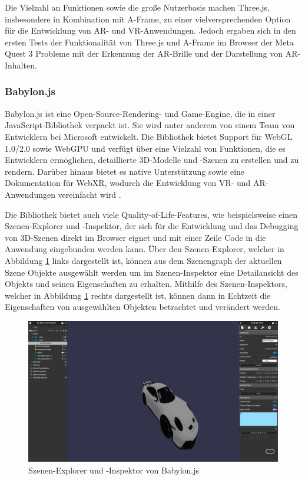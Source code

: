 Die Vielzahl an Funktionen sowie die große Nutzerbasis machen Three.js, insbesondere in Kombination mit A-Frame, zu einer vielversprechenden Option für die Entwicklung von AR- und VR-Anwendungen.
Jedoch ergaben sich in den ersten Tests der Funktionalität von Three.js und A-Frame im Browser der Meta Quest 3 Probleme mit der Erkennung der AR-Brille und der Darstellung von AR-Inhalten.

\subsubsection{Babylon.js}

Babylon.js ist eine Open-Source-Rendering- und Game-Engine, die in einer JavaScript-Bibliothek verpackt ist.
Sie wird unter anderem von einem Team von Entwicklern bei Microsoft entwickelt.
Die Bibliothek bietet Support für WebGL 1.0/2.0 sowie WebGPU und verfügt über eine Vielzahl von Funktionen, die es Entwicklern ermöglichen, detaillierte 3D-Modelle und -Szenen zu erstellen und zu rendern.
Darüber hinaus bietet es native Unterstützung sowie eine Dokumentation für WebXR, wodurch die Entwicklung von VR- und AR-Anwendungen vereinfacht wird \autocite[][]{babylon-features}.

Die Bibliothek bietet auch viele Quality-of-Life-Features, wie beispielsweise einen Szenen-Explorer und -Inspektor, der sich für die Entwicklung und das Debugging von 3D-Szenen direkt im Browser eignet und mit einer Zeile Code in die Anwendung eingebunden werden kann.
Über den Szenen-Explorer, welcher in Abbildung \ref{fig:babylon-inspector} links dargestellt ist, können aus dem Szenengraph der aktuellen Szene Objekte ausgewählt werden um im Szenen-Inspektor eine Detailansicht des Objekts und seinen Eigenschaften zu erhalten.
Mithilfe des Szenen-Inspektors, welcher in Abbildung \ref{fig:babylon-inspector} rechts dargestellt ist, können dann in Echtzeit die Eigenschaften von ausgewählten Objekten betrachtet und verändert werden.

\begin{figure}[H]
  \centering
  \includegraphics[width=1\textwidth]{images/BabylonInspector.png}
  \caption{Szenen-Explorer und -Inspektor von Babylon.js}
  \label{fig:babylon-inspector}
\end{figure}


